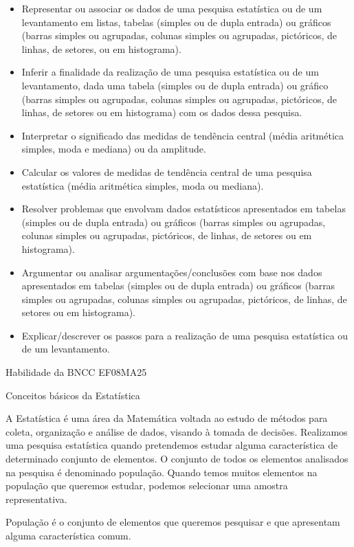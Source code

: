 \begin{itemize}
\item
  Representar ou associar os dados de uma pesquisa estatística ou de um
  levantamento em listas, tabelas (simples ou de dupla entrada) ou
  gráficos (barras simples ou agrupadas, colunas simples ou agrupadas,
  pictóricos, de linhas, de setores, ou em histograma).
\item
  Inferir a finalidade da realização de uma pesquisa estatística ou de
  um levantamento, dada uma tabela (simples ou de dupla entrada) ou
  gráfico (barras simples ou agrupadas, colunas simples ou agrupadas,
  pictóricos, de linhas, de setores ou em histograma) com os dados dessa
  pesquisa.
\item
  Interpretar o significado das medidas de tendência central (média
  aritmética simples, moda e mediana) ou da amplitude.
\item
  Calcular os valores de medidas de tendência central de uma pesquisa
  estatística (média aritmética simples, moda ou mediana).
\item
  Resolver problemas que envolvam dados estatísticos apresentados em
  tabelas (simples ou de dupla entrada) ou gráficos (barras simples ou
  agrupadas, colunas simples ou agrupadas, pictóricos, de linhas, de
  setores ou em histograma).
\item
  Argumentar ou analisar argumentações/conclusões com base nos dados
  apresentados em tabelas (simples ou de dupla entrada) ou gráficos
  (barras simples ou agrupadas, colunas simples ou agrupadas,
  pictóricos, de linhas, de setores ou em histograma).
\item
  Explicar/descrever os passos para a realização de uma pesquisa
  estatística ou de um levantamento.
\end{itemize}

Habilidade da BNCC EF08MA25

Conceitos básicos da Estatística

A Estatística é uma área da Matemática voltada ao estudo de métodos para
coleta, organização e análise de dados, visando à tomada de decisões.
Realizamos uma pesquisa estatística quando pretendemos estudar alguma
característica de determinado conjunto de elementos. O conjunto de todos
os elementos analisados na pesquisa é denominado população. Quando temos
muitos elementos na população que queremos estudar, podemos selecionar
uma amostra representativa.

População é o conjunto de elementos que queremos pesquisar e que
apresentam alguma característica comum.

